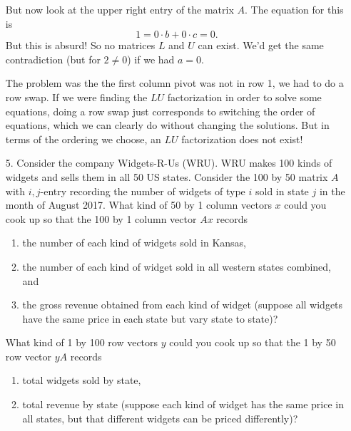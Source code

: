 \documentclass[11pt]{article}
\begin{document}
\begin{enumerate}
But now look at the upper right entry of the matrix $A$.  The equation for this is
\[1 = 0 \cdot b  + 0 \cdot c = 0. \]
But this is absurd!  So no matrices $L$ and $U$ can exist.  We'd get the same contradiction (but for $2 \neq 0$) if we had $a =0$.

The problem was the the first column pivot was not in row 1, we had to do a row swap.  If we were finding the $LU$ factorization in order to solve some equations, doing a row swap just corresponds to switching the order of equations, which we can clearly do without changing the solutions.  But in terms of the ordering we choose, an $LU$ factorization does not exist!

\item[5.] Consider the company Widgets-R-Us (WRU).  WRU makes 100 kinds of widgets and sells them in all 50 US states.  Consider the 100 by 50 matrix $A$ with $i,j$-entry recording the number of widgets of type $i$ sold in state $j$ in the month of August 2017.  What kind of 50 by 1 column vectors $x$ could you cook up so that the 100 by 1 column vector $Ax$ records 
\begin{enumerate}
\item the number of each kind of widgets sold in Kansas, 
\item the number of each kind of widget sold in all western states combined, and 
\item the gross revenue obtained from each kind of widget (suppose all widgets have the same price in each state but vary state to state)?  
\end{enumerate}
What kind of 1 by 100 row vectors $y$ could you cook up so that the 1 by 50 row vector $yA$ records 
\begin{enumerate}
\item total widgets sold by state, 
\item total revenue by state (suppose each kind of widget has the same price in all states, but that different widgets can be priced differently)?
\end{enumerate}


\end{enumerate}
\end{document}
